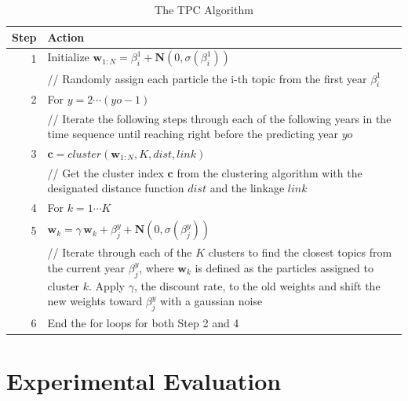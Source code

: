 \documentclass[conference]{IEEEtran}
\begin{document}
\begin{table}[h]
	\centering
	\begin{tabular}{r|p{7.25cm}}
		Step & Action\\
		\hline
		\hline
		1 & Initialize $\mathbf{w}_{1:N}=\beta^1_i + \mathbf{N}(0,\sigma(\beta^1_i))$ \\
		 & // Randomly assign each particle the i-th topic from the first year $\beta^1_i$\\
		 \hline
		2 & For $y = 2 \cdots (yo - 1)$\\
		 & // Iterate the following steps through each of the following years in the time sequence until reaching right before the predicting year $yo$\\
		 \hline
		3 & $\mathbf{c}=cluster(\mathbf{w}_{1:N}, K, dist, link)$\\
		& // Get the cluster index $\mathbf{c}$ from the clustering algorithm with the designated distance function $dist$ and the linkage $link$\\
		\hline
		4 & For $k = 1 \cdots K$ \\
		\hline
		5 & $\mathbf{w}_k = \gamma \, \mathbf{w}_k + \beta^y_j + \mathbf{N}(0,\sigma(\beta^y_j))$\\
		& // Iterate through each of the $K$ clusters to find the closest topics from the current year $\beta^y_j$, where $\mathbf{w}_k$ is defined as the particles assigned to cluster $k$. Apply $\gamma$, the discount rate, to the old weights and shift the new weights toward $\beta^y_j$ with a gaussian noise\\
		\hline
		6 & End the for loops for both Step 2 and 4\\
	\end{tabular}
	\caption{The TPC Algorithm}
	\label{TPC_algorithm}
\end{table}


\section{Experimental Evaluation}
\end{document}
